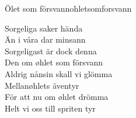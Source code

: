 \begin{song}{Ölet som försvann}{ohletsomforsvann}
\begin{vers}
Sorgeliga saker hända\\
Än i våra dar minsann\\
Sorgeligast är dock denna\\
Den om øhlet som försvann\\
Aldrig nånsin skall vi glömma\\
Mellanøhlets äventyr\\
För att nu om øhlet drömma\\
Helt vi oss till spriten tyr\\
\end{vers}
\end{song}
